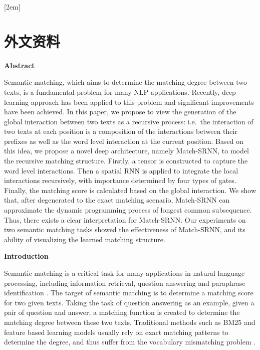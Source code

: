 
[2em]{\vspace{.5\baselineskip}\xiaosan\song}%
             {\prechaptername\CJKnumber{\thecontentslabel}\postchaptername\qquad}{} %
             {}             %
\chapter*{外文资料}

\textbf{Abstract}

Semantic matching, which aims to determine the matching degree between two texts, is a fundamental problem for many NLP applications. Recently, deep learning approach has been applied to this problem and significant improvements have been achieved. In this paper, we propose to view the generation of the global interaction between two texts as a recursive process: i.e.~the interaction of two texts at each position is a composition of the interactions between their prefixes as well as the word level interaction at the current position. Based on this idea, we propose a novel deep architecture, namely Match-SRNN, to model the recursive matching structure. Firstly, a tensor is constructed to capture the word level interactions. Then a spatial RNN is applied to integrate the local interactions recursively, with importance determined by four types of gates. Finally, the matching score is calculated based on the global interaction. We show that, after degenerated to the exact matching scenario, Match-SRNN can approximate the dynamic programming process of longest common subsequence. Thus, there exists a clear interpretation for Match-SRNN. Our experiments on two semantic matching tasks showed the effectiveness of Match-SRNN, and its ability of visualizing the learned matching structure.

	
\textbf{Introduction}

Semantic matching is a critical task for many applications in natural language processing, including information retrieval, question answering and paraphrase identification \cite{li2014semantic}. The target of semantic matching is to determine a matching score for two given texts.
Taking the task of question answering as an example, given a pair of question and answer, a matching function is created to determine the matching degree between these two texts. Traditional methods such as BM25 and feature based learning models usually rely on exact matching patterns to determine the degree, and thus suffer from the vocabulary mismatching problem \cite{li2014semantic}.

